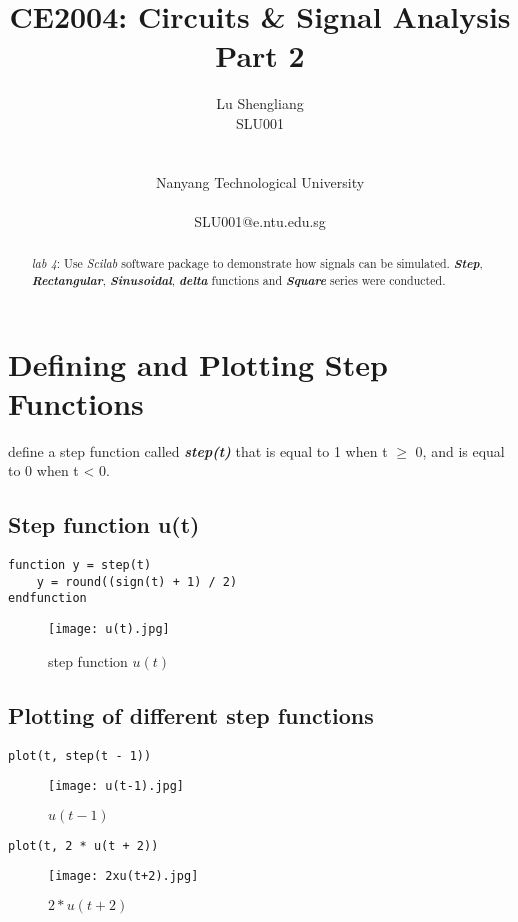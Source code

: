 \documentclass[12pt,fleqn]{article}
\title{CE2004: Circuits \& Signal Analysis Part 2}
\author{
  Lu Shengliang \\
  SLU001\\
  \Organization{} \\
  \vspace*{-10mm} \\
  Nanyang Technological University \\
  \vspace*{-10mm} \\
  SLU001@e.ntu.edu.sg
}
\begin{document}
\lstset{language=Scilab}
\maketitle

\begin{abstract}
\emph{lab 4}: Use \emph{Scilab} software package to demonstrate how signals can be simulated. \textbf{\emph{Step}}, \textbf{\emph{Rectangular}}, \textbf{\emph{Sinusoidal}}, \textbf{\emph{delta}} functions and \textbf{\emph{Square}} series were conducted.   
\end{abstract}


\section{Defining and Plotting Step Functions}
define a step function called \emph{\textbf{step(t)}} that is equal to 1 when t $\geq$ 0, and is equal to 0 when t \textless{} 0.
\subsection{Step function u(t)}
\begin{lstlisting}[frame=single]
function y = step(t)
    y = round((sign(t) + 1) / 2)
endfunction
\end{lstlisting}
\begin{figure}[H]
\centering
\texttt{[image: u(t).jpg]}
\caption{step function $u(t)$}
\end{figure}

\subsection{Plotting of different step functions}
\begin{lstlisting}[frame=single]
plot(t, step(t - 1))
\end{lstlisting}
\begin{figure}[H]
\centering
\texttt{[image: u(t-1).jpg]}
\caption{$u(t-1)$}
\end{figure}

\begin{lstlisting}[frame=single]
plot(t, 2 * u(t + 2))
\end{lstlisting}
\begin{figure}[H]
\centering
\texttt{[image: 2xu(t+2).jpg]}
\caption{$2*u(t+2)$}
\end{figure}
\end{document}
